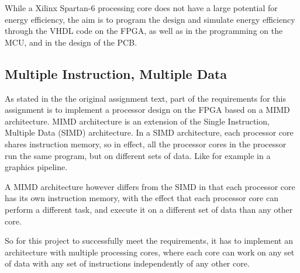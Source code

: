 While a Xilinx Spartan-6\cite{fpga-chip} processing core does not have a large
potential for energy efficiency, the aim is to program the  design and simulate
energy efficiency through the VHDL code on the FPGA, as well as in the
programming on the MCU, and in the design of the PCB.

\subsection{Multiple Instruction, Multiple Data}

As stated in the the original assignment text, part of the requirements for this
assignment is to implement a processor design on the FPGA based on a MIMD
architecture. MIMD architecture is an extension of the Single Instruction,
Multiple Data (SIMD) architecture. In a SIMD architecture, each processor core
shares instruction memory, so in effect, all the processor cores in the
processor run the same program, but on different sets of data. Like for example
in a graphics pipeline.

A MIMD architecture however differs from the SIMD in that each processor core
has its own instruction memory, with the effect that each processor core can
perform a different task, and execute it on a different set of data than any
other core.

So for this project to successfully meet the requirements, it has to implement
an architecture with multiple processing cores, where each core can work on any
set of data with any set of instructions independently of any other core.
